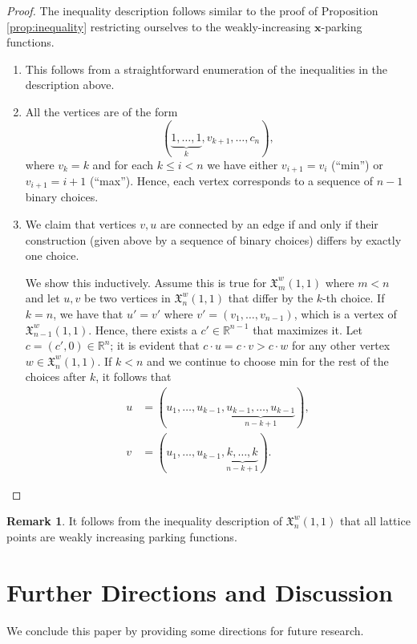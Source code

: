 \documentclass[11pt]{amsart}
\theoremstyle{definition}
\newtheorem{remark}[theorem]{Remark}
\newcommand{\0}{\emptyset}
\newcommand{\bx}{\mathbf{x}}
\newcommand{\X}{\mathfrak{X}}
\begin{document}
\begin{proof}
The inequality description follows similar to the proof of Proposition \ref{prop:inequality} restricting ourselves to the weakly-increasing $\bx$-parking functions. 
\begin{enumerate}[($i$)]
    \item This follows from a straightforward enumeration of the inequalities in the description above. 
    \item All the vertices are of the form $$(\underbrace{1,\ldots,1}_k, v_{k+1}, \dots, c_n),$$ where  $v_k = k$ and for each $k \leq i < n$ we have either  $v_{i+1} = v_i$ (``min'') or $v_{i+1} =i+1$ (``max'').  
    Hence, each vertex corresponds to a sequence of $n-1$ binary choices.
    \item We claim that vertices $v,u$ are connected by an edge if and only if their construction (given above by a sequence of binary choices) differs by exactly one choice.

We show this inductively.
Assume this is true for $\X_m^w (1,1)$ where $m<n$ and let $u,v$ be two vertices in $\X_n^w(1,1)$ that differ by the $k$-th choice.
If $k = n$, we have that $u' = v'$ where $v' = (v_1, \dots, v_{n-1})$, which is a vertex of $\X_{n-1}^w (1,1)$. 
Hence, there exists a $c'\in \mathbb{R}^{n-1}$ that maximizes it. 
Let $c = (c',0)\in \mathbb{R}^n$; it is evident that $c\cdot u = c\cdot v > c \cdot w$ for any other vertex $w\in \X_n^w(1,1)$.
If $k<n$ and we continue to choose min for the rest of the choices after $k$, it follows that
\begin{align*}
    u &= (u_1, \dots, u_{k-1}, \underbrace{u_{k-1}, \dots, u_{k-1}}_{n-k+1}), \\ v &= (u_1, \dots, u_{k-1}, \underbrace{k, \dots, k}_{n-k+1}).
\end{align*}
\end{enumerate}
\end{proof}



\begin{remark}
It follows from the inequality description of $\X_n^w(1,1)$ that all lattice points are weakly increasing parking functions.
\end{remark}






\section{Further Directions and Discussion}\label{sec:future}
We conclude this paper by providing some directions for future research. 
\end{document}
